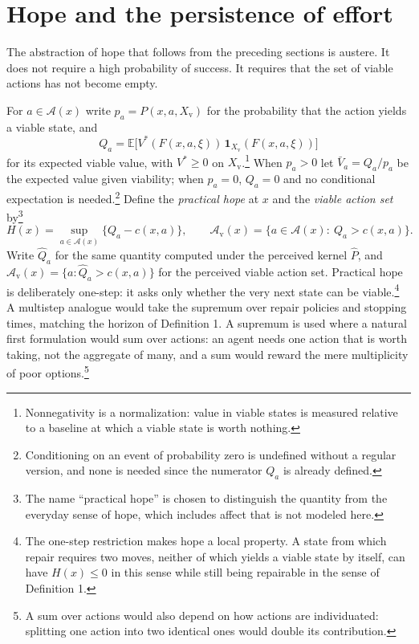 \documentclass[11pt]{article}
\theoremstyle{remark}
\newcommand{\E}{\mathbb{E}}
\newcommand{\Xv}{X_{\mathrm{v}}}
\begin{document}
\section{Hope and the persistence of effort}

The abstraction of hope that follows from the preceding sections is austere. It does not require a high probability of success. It requires that the set of viable actions has not become empty.

For $a\in\mathcal A(x)$ write $p_a=P(x,a,\Xv)$ for the probability that the action yields a viable state, and
\[
Q_a=\E\bigl[V^\ast(F(x,a,\xi))\,\mathbf 1_{\Xv}(F(x,a,\xi))\bigr]
\]
for its expected viable value, with $V^\ast\ge0$ on $\Xv$.\footnote{Nonnegativity is a normalization: value in viable states is measured relative to a baseline at which a viable state is worth nothing.} When $p_a>0$ let $\bar V_a=Q_a/p_a$ be the expected value given viability; when $p_a=0$, $Q_a=0$ and no conditional expectation is needed.\footnote{Conditioning on an event of probability zero is undefined without a regular version, and none is needed since the numerator $Q_a$ is already defined.} Define the \emph{practical hope} at $x$ and the \emph{viable action set} by\footnote{The name ``practical hope'' is chosen to distinguish the quantity from the everyday sense of hope, which includes affect that is not modeled here.}
\[
H(x)=\sup_{a\in\mathcal A(x)}\bigl\{Q_a-c(x,a)\bigr\},\qquad
\mathcal A_{\mathrm{v}}(x)=\bigl\{a\in\mathcal A(x):\ Q_a>c(x,a)\bigr\}.
\]
Write $\hat Q_a$ for the same quantity computed under the perceived kernel $\hat P$, and $\hat{\mathcal A}_{\mathrm v}(x)=\{a:\hat Q_a>c(x,a)\}$ for the perceived viable action set. Practical hope is deliberately one-step: it asks only whether the very next state can be viable.\footnote{The one-step restriction makes hope a local property. A state from which repair requires two moves, neither of which yields a viable state by itself, can have $H(x)\le0$ in this sense while still being repairable in the sense of Definition 1.} A multistep analogue would take the supremum over repair policies and stopping times, matching the horizon of Definition 1.
A supremum is used where a natural first formulation would sum over actions: an agent needs one action that is worth taking, not the aggregate of many, and a sum would reward the mere multiplicity of poor options.\footnote{A sum over actions would also depend on how actions are individuated: splitting one action into two identical ones would double its contribution.}
\end{document}
